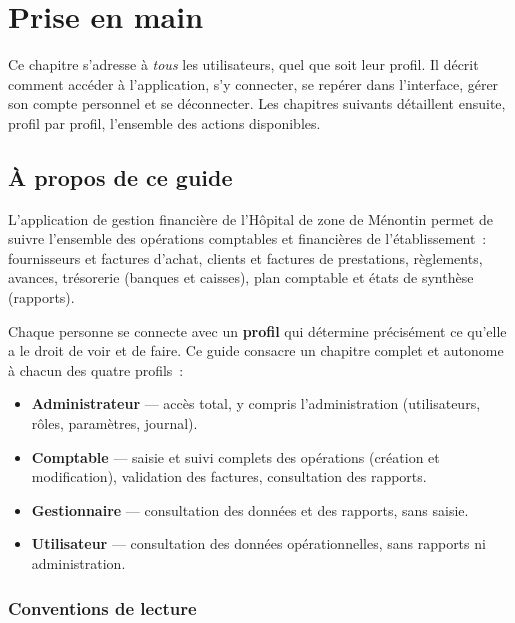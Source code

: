 \chapter{Prise en main}

Ce chapitre s'adresse à \emph{tous} les utilisateurs, quel que soit leur profil. Il décrit comment accéder à l'application, s'y connecter, se repérer dans l'interface, gérer son compte personnel et se déconnecter. Les chapitres suivants détaillent ensuite, profil par profil, l'ensemble des actions disponibles.

\section{À propos de ce guide}

L'application de gestion financière de l'Hôpital de zone de Ménontin permet de suivre l'ensemble des opérations comptables et financières de l'établissement~: fournisseurs et factures d'achat, clients et factures de prestations, règlements, avances, trésorerie (banques et caisses), plan comptable et états de synthèse (rapports).

Chaque personne se connecte avec un \textbf{profil} qui détermine précisément ce qu'elle a le droit de voir et de faire. Ce guide consacre un chapitre complet et autonome à chacun des quatre profils~:

\begin{itemize}
  \item \textbf{Administrateur} — accès total, y compris l'administration (utilisateurs, rôles, paramètres, journal).
  \item \textbf{Comptable} — saisie et suivi complets des opérations (création et modification), validation des factures, consultation des rapports.
  \item \textbf{Gestionnaire} — consultation des données et des rapports, sans saisie.
  \item \textbf{Utilisateur} — consultation des données opérationnelles, sans rapports ni administration.
\end{itemize}


\subsection*{Conventions de lecture}

